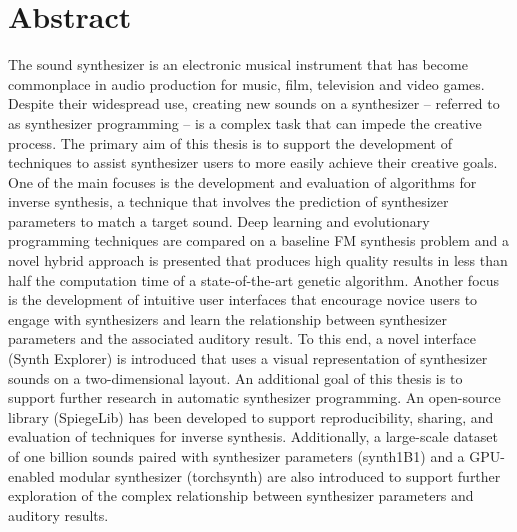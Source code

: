 \newpage
{}

\chapter*{Abstract}
The sound synthesizer is an electronic musical instrument that has become commonplace in audio production for music, film, television and video games. Despite their widespread use, creating new sounds on a synthesizer -- referred to as synthesizer programming -- is a complex task that can impede the creative process. The primary aim of this thesis is to support the development of techniques to assist synthesizer users to more easily achieve their creative goals. One of the main focuses is the development and evaluation of algorithms for inverse synthesis, a technique that involves the prediction of synthesizer parameters to match a target sound. Deep learning and evolutionary programming techniques are compared on a baseline FM synthesis problem and a novel hybrid approach is presented that produces high quality results in less than half the computation time of a state-of-the-art genetic algorithm. Another focus is the development of intuitive user interfaces that encourage novice users to engage with synthesizers and learn the relationship between synthesizer parameters and the associated auditory result. To this end, a novel interface (Synth Explorer) is introduced that uses a visual representation of synthesizer sounds on a two-dimensional layout. An additional goal of this thesis is to support further research in automatic synthesizer programming. An open-source library (SpiegeLib) has been developed to support reproducibility, sharing, and evaluation of techniques for inverse synthesis. Additionally, a large-scale dataset of one billion sounds paired with synthesizer parameters (synth1B1) and a GPU-enabled modular synthesizer (torchsynth) are also introduced to support further exploration of the complex relationship between synthesizer parameters and auditory results.







